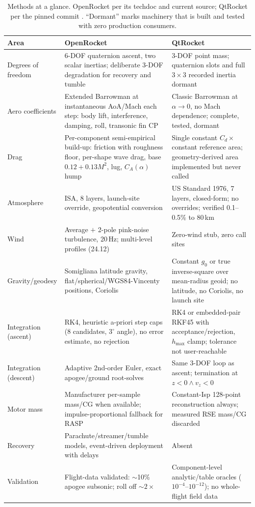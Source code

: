 \begin{table}[htbp]
\small
\caption{Methods at a glance. OpenRocket per its techdoc and current source; QtRocket per
the pinned commit . ``Dormant'' marks machinery that is built and tested with
zero production consumers.}
\label{tab:or-methods-summary}
\begin{tabularx}{\textwidth}{@{}>{\raggedright\arraybackslash}p{2.6cm}XX@{}}
\toprule
\textbf{Area} & \textbf{OpenRocket} & \textbf{QtRocket} \\
\midrule
Degrees of freedom & 6-DOF quaternion ascent, two scalar inertias; deliberate 3-DOF
degradation for recovery and tumble & 3-DOF point mass; quaternion slots and full
$3\times 3$ recorded inertia dormant \\
\addlinespace
Aero coefficients & Extended Barrowman at instantaneous AoA/Mach each step: body lift,
interference, damping, roll, transonic fin CP & Classic Barrowman at $\alpha\to 0$, no Mach
dependence; complete, tested, dormant \\
\addlinespace
Drag & Per-component semi-empirical build-up: friction with roughness floor, per-shape wave
drag, base $0.12+0.13M^2$, lug, $C_A(\alpha)$ hump & Single constant $C_d \times$ constant
reference area; geometry-derived area implemented but never called \\
\addlinespace
Atmosphere & ISA, 8 layers, launch-site override, geopotential conversion & US Standard
1976, 7 layers, closed-form; no overrides; verified 0.1--0.5\% to 80\,km \\
\addlinespace
Wind & Average $+$ 2-pole pink-noise turbulence, 20\,Hz; multi-level profiles (24.12) &
Zero-wind stub, zero call sites \\
\addlinespace
Gravity/geodesy & Somigliana latitude gravity, flat/spherical/WGS84-Vincenty positions,
Coriolis & Constant $g_0$ or true inverse-square over mean-radius geoid; no latitude, no
Coriolis, no launch site \\
\addlinespace
Integration (ascent) & RK4, heuristic a-priori step caps (8 candidates, $3^\circ$ angle), no
error estimate, no rejection & RK4 or embedded-pair RKF45 with acceptance/rejection,
$h_{\max}$ clamp; tolerance not user-reachable \\
\addlinespace
Integration (descent) & Adaptive 2nd-order Euler, exact apogee/ground root-solves & Same
3-DOF loop as ascent; termination at $z<0 \wedge v_z<0$ \\
\addlinespace
Motor mass & Manufacturer per-sample mass/CG when available; impulse-proportional fallback
for RASP & Constant-Isp 128-point reconstruction always; measured RSE mass/CG discarded \\
\addlinespace
Recovery & Parachute/streamer/tumble models, event-driven deployment with delays & Absent \\
\addlinespace
Validation & Flight-data validated: $\sim$10\% apogee subsonic; roll off $\sim 2\times$ &
Component-level analytic/table oracles ($10^{-4}$--$10^{-12}$); no whole-flight field data \\
\bottomrule
\end{tabularx}
\end{table}

